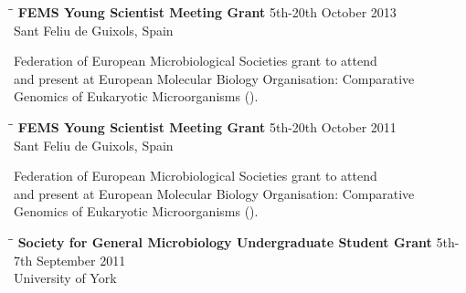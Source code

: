 \documentclass{res}
\begin{document}
\begin{resume}
   \vspace{-0.1in}  
   \begin{tabbing}
   \hspace{2in}\= \hspace{2.6in}\= \kill 
    {\bf FEMS Young Scientist Meeting Grant} \> \> 5th-20th October 2013\\
                            \>  
                            \> Sant Feliu de Guixols, Spain \\
                       
   \end{tabbing}\vspace{-30pt}      

    Federation of European Microbiological Societies grant to attend\\ and present at European Molecular Biology Organisation: Comparative \\Genomics of Eukaryotic Microorganisms ().

 
 \vspace{-0.1in}  
   \begin{tabbing}
   \hspace{2in}\= \hspace{2.6in}\= \kill 
    {\bf FEMS Young Scientist Meeting Grant} \> \> 5th-20th October 2011\\
                            \>  
                            \> Sant Feliu de Guixols, Spain \\
                       
   \end{tabbing}\vspace{-30pt}      

    Federation of European Microbiological Societies grant to attend\\ and present at European Molecular Biology Organisation: Comparative \\Genomics of Eukaryotic Microorganisms ().

 
\vspace{-0.1in}  
   \begin{tabbing}
   \hspace{2in}\= \hspace{2.6in}\= \kill
    {\bf Society for General Microbiology Undergraduate Student Grant} \> \> 5th-7th September 2011\\
                            \> 
                            \> University of York \\


\end{tabbing}
\end{resume}
\end{document}
